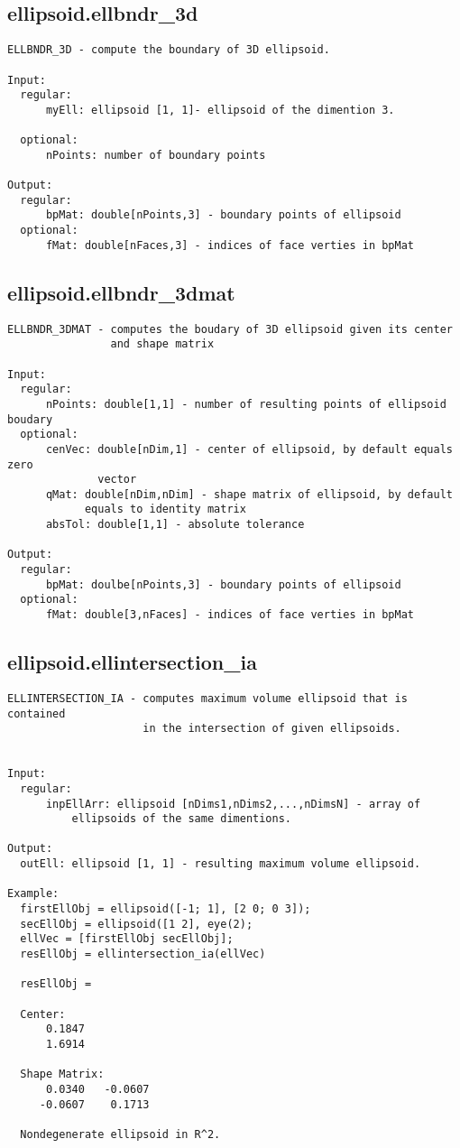 \subsection{\texorpdfstring{ellipsoid.ellbndr\_3d}{ellbndr\_3d}}\label{method:ellipsoid.ellbndr3d}
\begin{verbatim}
ELLBNDR_3D - compute the boundary of 3D ellipsoid.

Input:
  regular:
      myEll: ellipsoid [1, 1]- ellipsoid of the dimention 3.

  optional:
      nPoints: number of boundary points

Output:
  regular:
      bpMat: double[nPoints,3] - boundary points of ellipsoid
  optional:
      fMat: double[nFaces,3] - indices of face verties in bpMat
\end{verbatim}
\subsection{\texorpdfstring{ellipsoid.ellbndr\_3dmat}{ellbndr\_3dmat}}\label{method:ellipsoid.ellbndr3dmat}
\begin{verbatim}
ELLBNDR_3DMAT - computes the boudary of 3D ellipsoid given its center
                and shape matrix

Input:
  regular:
      nPoints: double[1,1] - number of resulting points of ellipsoid boudary
  optional:
      cenVec: double[nDim,1] - center of ellipsoid, by default equals zero
              vector
      qMat: double[nDim,nDim] - shape matrix of ellipsoid, by default
            equals to identity matrix
      absTol: double[1,1] - absolute tolerance

Output:
  regular:
      bpMat: doulbe[nPoints,3] - boundary points of ellipsoid
  optional:
      fMat: double[3,nFaces] - indices of face verties in bpMat
\end{verbatim}
\subsection{\texorpdfstring{ellipsoid.ellintersection\_ia}{ellintersection\_ia}}\label{method:ellipsoid.ellintersectionia}
\begin{verbatim}
ELLINTERSECTION_IA - computes maximum volume ellipsoid that is contained
                     in the intersection of given ellipsoids.


Input:
  regular:
      inpEllArr: ellipsoid [nDims1,nDims2,...,nDimsN] - array of
          ellipsoids of the same dimentions.

Output:
  outEll: ellipsoid [1, 1] - resulting maximum volume ellipsoid.

Example:
  firstEllObj = ellipsoid([-1; 1], [2 0; 0 3]);
  secEllObj = ellipsoid([1 2], eye(2);
  ellVec = [firstEllObj secEllObj];
  resEllObj = ellintersection_ia(ellVec)

  resEllObj =

  Center:
      0.1847
      1.6914

  Shape Matrix:
      0.0340   -0.0607
     -0.0607    0.1713

  Nondegenerate ellipsoid in R^2.
\end{verbatim}
